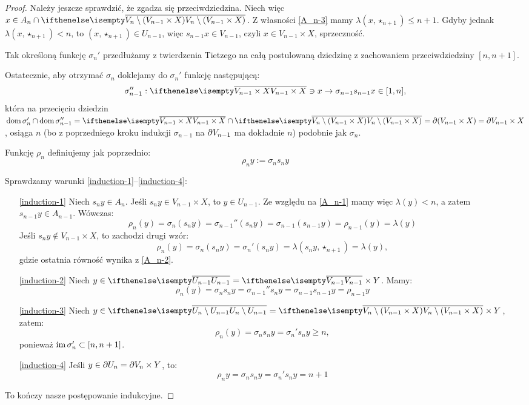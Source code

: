 \begin{thm}
\begin{proof}
  Należy jeszcze sprawdzić, że zgadza się przeciwdziedzina. Niech więc $x \in A_n \cap \cl{V_n\setminus(V_{n-1}\times X)}$. Z własności \ref{A_n-3} mamy $\lambda(x,\star_{n+1}) \leq n+1$. Gdyby jednak $\lambda(x,\star_{n+1}) < n$, to $(x,\star_{n+1})\in U_{n-1}$, więc $s_{n-1} x\in V_{n-1}$, czyli $x\in V_{n-1}\times X$, sprzeczność.
  
  Tak określoną funkcję $\sigma_n'$ przedłużamy z twierdzenia Tietzego na całą postulowaną dziedzinę z zachowaniem przeciwdziedziny $[n,n+1]$.
  
  Ostatecznie, aby otrzymać $\sigma_n$ doklejamy do $\sigma_n'$ funkcję następującą:
  \[
    \sigma_{n-1}'': \cl{V_{n-1}\times X}\ni x \to \sigma_{n-1}s_{n-1}x \in [1,n],
  \]
  która na przecięciu dziedzin $\dom \sigma_n' \cap \dom \sigma_{n-1}'' = \cl{V_{n-1}\times X} \cap \cl{V_n \setminus (V_{n-1}\times X)} =\bd({V_{n-1}\times X}) = \bd{V_{n-1}}\times X$, osiąga $n$ (bo z poprzedniego kroku indukcji $\sigma_{n-1}$ na $\partial{V_{n-1}}$ ma dokładnie $n$) podobnie jak $\sigma_n$.
  
  Funkcję $\rho_n$ definiujemy jak poprzednio:
  \[
    \rho_n y := \sigma_n s_n y
  \]
  
  Sprawdzamy warunki \ref{induction-1}--\ref{induction-4}:
  \begin{enumerate}
    \item[\ref{induction-1}] Niech $s_n y \in A_n$. Jeśli $s_n y\in V_{n-1}\times X$, to $y\in U_{n-1}$. Ze względu na \ref{A_n-1} mamy więc $\lambda(y) < n$, a zatem $s_{n-1}y \in A_{n-1}$. Wówczas:
    \[
      \rho_n(y) = \sigma_n(s_n y) = \sigma_{n-1}''(s_n y) = \sigma_{n-1}(s_{n-1}y) = \rho_{n-1}(y) = \lambda(y)
    \]
    Jeśli $s_n y\not\in V_{n-1}\times X$, to zachodzi drugi wzór:
    \[
      \rho_n(y) = \sigma_n(s_n y) = \sigma_n'(s_n y) = \lambda(s_n y, \star_{n+1}) = \lambda(y),
    \]
    gdzie ostatnia równość wynika z \ref{A_n-2}.
   \item[\ref{induction-2}] Niech $y\in\cl{U_{n-1}} = \cl{V_{n-1}}\times Y$. Mamy:
   \[
     \rho_n(y) = \sigma_n s_n y = \sigma_{n-1}'' s_n y = \sigma_{n-1} s_{n-1} y = \rho_{n-1} y
   \]
   \item[\ref{induction-3}] Niech $y \in \cl{U_n \setminus U_{n-1}} = \cl{V_n \setminus (V_{n-1}\times X)}\times Y$, zatem:
   \[
     \rho_n(y) = \sigma_n s_n y = \sigma_n' s_n y \geq n,
   \]
   ponieważ $\operatorname{im} \sigma_n' \subset [n,n+1]$.
   \item[\ref{induction-4}] Jeśli $y\in\partial U_n = \partial V_n \times Y$, to:
   \[
     \rho_n y = \sigma_n s_n y = \sigma_n' s_n y = n+1
   \]
  \end{enumerate}
  To kończy nasze postępowanie indukcyjne.


\end{proof}
\end{thm}
